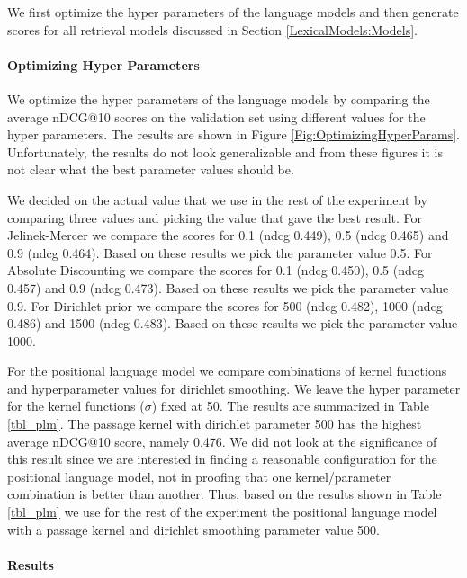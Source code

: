 We first optimize the hyper parameters of the 
language models and then generate scores for
all retrieval models discussed in 
Section \ref{LexicalModels:Models}.

\paragraph{Optimizing Hyper Parameters}

We optimize the hyper parameters of the language models
by comparing the average nDCG@10 scores on the validation set 
using different values for the hyper parameters.
The results are shown in Figure \ref{Fig:OptimizingHyperParams}.
Unfortunately, the results do not look generalizable and 
from these figures it is not clear what 
the best parameter values should be. 



We decided on the actual value that we use in the rest of the experiment
by comparing three values and picking the value that gave the best result.
%
For Jelinek-Mercer we compare the scores for 0.1 (ndcg 0.449),
0.5 (ndcg 0.465) and 0.9 (ndcg 0.464). Based on these results we pick
the parameter value 0.5. 
%
For Absolute Discounting we compare the scores for 0.1 (ndcg 0.450),
0.5 (ndcg 0.457) and 0.9 (ndcg 0.473). Based on these results we pick
the parameter value 0.9. 
%
For Dirichlet prior we compare the scores for 500 (ndcg 0.482),
1000 (ndcg 0.486) and 1500 (ndcg 0.483). Based on these results we pick
the parameter value 1000. 




For the positional language model we compare combinations of
kernel functions and hyperparameter values for dirichlet smoothing.
We leave the hyper parameter for the kernel functions ($\sigma$) fixed at 50.
The results are summarized in Table \ref{tbl_plm}.
The passage kernel with dirichlet parameter 500 has the highest
average nDCG@10 score, namely 0.476. We did not look at the
significance of this result since we are interested
in finding a reasonable configuration for the positional language model, not in proofing that one kernel/parameter combination is better than another.
Thus, based on the results shown in Table \ref{tbl_plm}  we use for the rest of the experiment the positional language model with a passage kernel and dirichlet smoothing parameter value 500.



\paragraph{Results}

